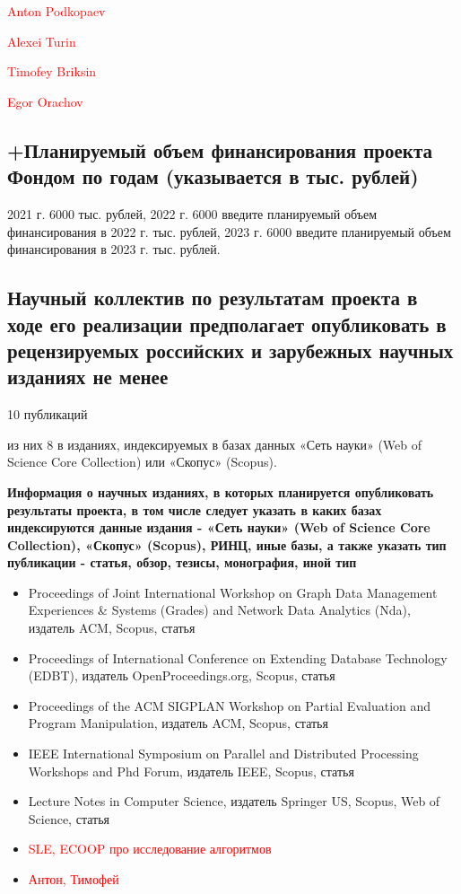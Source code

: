 \documentclass[12pt]{article}  %
\theoremstyle{remark}
\newcommand{\checkme}[1]{\textcolor{red}{#1}}
\begin{document}
\checkme{Anton Podkopaev}

\checkme{Alexei Turin}

\checkme{Timofey Briksin}

\checkme{Egor Orachov}


\subsection{+Планируемый объем финансирования проекта Фондом по годам (указывается в тыс. рублей)}
2021 г. 6000 тыс. рублей,
2022 г. 6000 введите планируемый объем финансирования в 2022 г. тыс. рублей,
2023 г. 6000 введите планируемый объем финансирования в 2023 г. тыс. рублей.

\subsection{Научный коллектив по результатам проекта в ходе его реализации предполагает опубликовать в рецензируемых российских и зарубежных научных изданиях не менее}

10 публикаций

из них 8 в изданиях, индексируемых в базах данных «Сеть науки» (Web of Science Core Collection) или «Скопус» (Scopus).

\textbf{Информация о научных изданиях, в которых планируется опубликовать результаты проекта, в том числе следует указать в каких базах индексируются данные издания - «Сеть науки» (Web of Science Core Collection), «Скопус» (Scopus), РИНЦ, иные базы, а также указать тип публикации - статья, обзор, тезисы, монография, иной тип}
\begin{itemize}
  \item Proceedings of Joint International Workshop on Graph Data Management Experiences \& Systems (Grades) and Network Data Analytics (Nda), издатель  ACM, Scopus, статья
  \item Proceedings of International Conference on Extending Database Technology (EDBT), издатель OpenProceedings.org, Scopus, статья
  \item Proceedings of the ACM SIGPLAN Workshop on Partial Evaluation and Program Manipulation, издатель  ACM, Scopus, статья
  \item IEEE International Symposium on Parallel and Distributed Processing Workshops and Phd Forum, издатель  IEEE, Scopus, статья
  \item Lecture Notes in Computer Science, издатель Springer US, Scopus, Web of Science, статья
  \item \checkme{SLE, ECOOP про исследование алгоритмов}
  \item \checkme{Антон, Тимофей}
\end{itemize}
\end{document}
